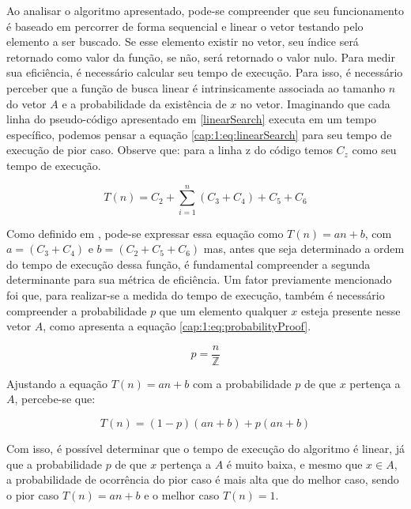 

Ao analisar o algoritmo apresentado, pode-se compreender que seu funcionamento é baseado em percorrer
de forma sequencial e linear o vetor testando pelo elemento a ser buscado. Se esse elemento existir no vetor,
seu índice será retornado como valor da função, se não, será retornado o valor nulo. Para medir sua eficiência,
é necessário calcular seu tempo de execução. Para isso, é necessário perceber que a função de busca linear é
intrinsicamente associada ao tamanho $n$ do vetor $A$ e a probabilidade da existência de $x$ no vetor. Imaginando que
cada linha do pseudo-código apresentado em \ref{linearSearch} executa em um tempo específico, podemos pensar a
equação \ref{cap:1:eq:linearSearch} para seu tempo de execução de pior caso. Observe que: para a linha z do código
temos $C_z$ como seu tempo de execução.

\begin{equation} \label{cap:1:eq:linearSearch}
    T(n) = C_2 + \sum_{i=1}^{n}(C_3 + C_4) + C_5 + C_6
\end{equation}

Como definido em \cite{cormen2022algorithms}, pode-se expressar essa equação como $T(n) = an + b$, com $a = (C_3 + C_4)$
e $b = (C_2 + C_5 + C_6)$ mas, antes que seja determinado a ordem do tempo de execução dessa função, é fundamental compreender
a segunda determinante para sua métrica de eficiência. Um fator previamente mencionado foi que, para realizar-se a medida do tempo
de execução, também é necessário compreender a probabilidade $p$ que um elemento qualquer $x$ esteja presente nesse vetor $A$, como
apresenta a equação \ref{cap:1:eq:probabilityProof}.

\begin{equation} \label{cap:1:eq:probabilityProof}
    p = \frac{n}{\mathbb{Z}}
\end{equation}

Ajustando a equação $T(n) = an + b$ com a probabilidade $p$ de que $x$ pertença a $A$, percebe-se que:

\begin{equation*} 
    T(n) = (1 - p)(an + b) + p(an + b)
\end{equation*}

Com isso, é possível determinar que o tempo de execução do algoritmo é linear, já que a probabilidade $p$ de que
$x$ pertença a $A$ é muito baixa, e mesmo que $x \in A$, a probabilidade de ocorrência do pior caso é mais alta
que do melhor caso, sendo o pior caso $T(n) = an + b$ e o melhor caso $T(n) = 1$.

